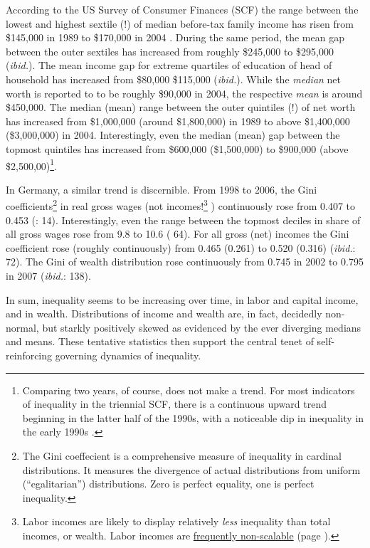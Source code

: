According to the US Survey of Consumer Finances (SCF) the range between the lowest and highest sextile (!) of median before-tax family income has risen from \$145,000 in 1989 to \$170,000 in 2004 \citep{Bucks2006}. During the same period, the mean gap between the outer sextiles has increased from roughly \$245,000 to \$295,000 (\emph{ibid.}). The mean income gap for extreme quartiles of education of head of household has increased from \$80,000 \$115,000 (\emph{ibid.}). While the \emph{median} net worth is reported to to be roughly \$90,000 in 2004, the respective \emph{mean} is around \$450,000. The median (mean) range between the outer quintiles (!) of net worth has increased from \$1,000,000 (around \$1,800,000) in 1989 to above \$1,400,000 (\$3,000,000) in 2004. Interestingly, even the median (mean) gap between the topmost quintiles has increased from \$600,000 (\$1,500,000) to \$900,000 (above \$2,500,00)\footnote{Comparing two years, of course, does not make a trend. For most indicators of inequality in the triennial SCF, there is a continuous upward trend beginning in the latter half of the 1990s, with a noticeable dip in inequality in the early 1990s \citep{Bucks2006}.}.

In Germany, a similar trend is discernible. From 1998 to 2006, the Gini coefficients\footnote{
	The Gini coeffecient is a comprehensive measure of inequality in cardinal distributions. It measures the divergence of actual distributions from uniform (``egalitarian'') distributions. Zero is perfect equality, one is perfect inequality.} 
in real gross wages (not incomes!\footnote{
	Labor incomes are likely to display relatively \emph{less} inequality than total incomes, or wealth. Labor incomes are \hyperref[sec:Extremistan]{frequently non-scalable} (page \pageref{sec:Extremistan}).}
) continuously rose from 0.407 to 0.453 (\citealt{Bundesregierung2006}: 14). Interestingly, even the range between the topmost deciles in share of all gross wages rose from 9.8 to 10.6 (\citealt{Grabka2007a} 64). For all gross (net) incomes the Gini coefficient rose (roughly continuously) from 0.465 (0.261) to 0.520 (0.316) (\emph{ibid.}: 72). The Gini of wealth distribution rose continuously from 0.745 in 2002 to 0.795 in 2007 (\emph{ibid.}: 138). 

In sum, inequality seems to be increasing over time, in labor and capital income, and in wealth. Distributions of income and wealth are, in fact, decidedly non-normal, but starkly positively skewed as evidenced by the ever diverging medians and means. These tentative statistics then support the central tenet of self-reinforcing governing dynamics of inequality.


